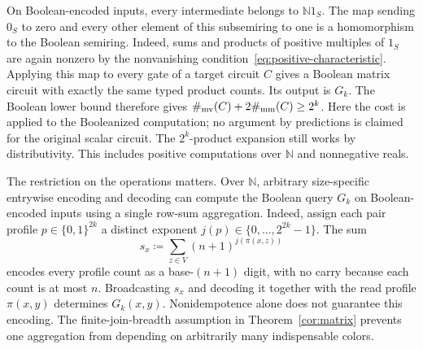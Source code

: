 On Boolean-encoded inputs, every intermediate belongs to $\mathbb N1_S$.
The map sending $0_S$ to zero and every other element of this subsemiring
to one is a homomorphism to the Boolean semiring. Indeed, sums and products
of positive multiples of $1_S$ are again nonzero by the nonvanishing
condition~\eqref{eq:positive-characteristic}. Applying this map to every gate of
a target circuit $C$ gives a Boolean matrix circuit with exactly the same
typed product counts.
Its output is $G_k$. The Boolean lower bound therefore gives
$\#_{\mathrm{mv}}(C)+2\#_{\mathrm{mm}}(C)\ge2^k$.
Here the cost is applied to the Booleanized computation; no argument by
predictions is claimed for the original scalar circuit.
The $2^k$-product expansion still works by distributivity. This includes
positive computations over $\mathbb N$ and nonnegative reals.

The restriction on the operations matters. Over $\mathbb N$, arbitrary
size-specific entrywise encoding and decoding can compute the Boolean
query $G_k$ on Boolean-encoded inputs using a single row-sum aggregation.
Indeed, assign each pair profile $p\in\{0,1\}^{2k}$ a distinct exponent
$j(p)\in\{0,\ldots,2^{2k}-1\}$. The sum
\[
 s_x\coloneqq\sum_{z\in V}(n+1)^{j(\pi(x,z))}
\]
encodes every profile count as a base-$(n+1)$ digit, with no carry
because each count is at most $n$. Broadcasting $s_x$ and decoding it
together with the read profile $\pi(x,y)$ determines $G_k(x,y)$.
Nonidempotence alone does not guarantee this encoding.
The finite-join-breadth assumption in Theorem~\ref{cor:matrix} prevents
one aggregation from depending on arbitrarily many indispensable colors.

